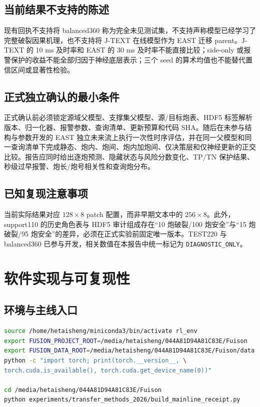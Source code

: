 \documentclass[11pt,a4paper]{article}
\newcommand{\code}[1]{\texttt{\small #1}}
\begin{document}
\subsection{当前结果不支持的陈述}

现有回执不支持将 balanced360 称为完全未见测试集，不支持声称模型已经学习了完整破裂因果机理，也不支持将 J-TEXT 在线模型作为 EAST 迁移 parent。J-TEXT 的 10 ms 及时率和 EAST 的 30 ms 及时率不能直接比较；side-only 或报警保护的收益不能全部归因于神经底层表示；三个 seed 的算术均值也不能替代置信区间或显著性检验。

\subsection{正式独立确认的最小条件}

正式确认前必须锁定源域父模型、支撑集父模型、源/目标炮表、HDF5 标签解析版本、归一化器、报警参数、查询清单、更新预算和代码 SHA。随后在未参与结构与参数开发的 EAST 独立未来流上执行一次性时序评估，并在同一父模型和同一查询清单下完成静态、炮内、炮间、炮内加炮间、仅决策层和仅神经更新的正交比较。报告应同时给出逐炮预测、隐藏状态与风险分数变化、TP/TN 保护结果、秒级过早报警、炮长/炮号相关性和查询炮分布。

\subsection{已知复现注意事项}

当前实际结果对应 \(128\times8\) patch 配置，而非早期文本中的 \(256\times8\)。此外，support110 的历史角色表与 HDF5 审计组成存在“10 炮破裂/100 炮安全”与“15 炮破裂/95 炮安全”的差异，必须在正式实验前固定唯一版本。TEST220 与 balanced360 已参与开发，相关数值在本报告中统一标记为 \code{DIAGNOSTIC\_ONLY}。

\section{软件实现与可复现性}

\subsection{环境与主线入口}

\begin{lstlisting}[language=bash]
source /home/hetaisheng/miniconda3/bin/activate rl_env
export FUSION_PROJECT_ROOT=/media/hetaisheng/044A81D94A81C83E/Fuison
export FUSION_DATA_ROOT=/media/hetaisheng/044A81D94A81C83E/Fuison/data
python -c "import torch; print(torch.__version__, \
torch.cuda.is_available(), torch.cuda.get_device_name(0))"

cd /media/hetaisheng/044A81D94A81C83E/Fuison
python experiments/transfer_methods_2026/build_mainline_receipt.py
\end{lstlisting}
\end{document}
